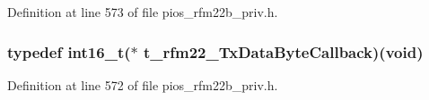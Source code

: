 Definition at line 573 of file pios\-\_\-rfm22b\-\_\-priv.\-h.

\hypertarget{group___p_i_o_s___r_f_m22_b_ga10adbdf30d2b2a9c6eab132094364df2}{
\subsubsection[{t\-\_\-rfm22\-\_\-\-Tx\-Data\-Byte\-Callback}]{\setlength{\rightskip}{0pt plus 5cm}typedef {\bf int16\-\_\-t}($\ast$ t\-\_\-rfm22\-\_\-\-Tx\-Data\-Byte\-Callback)({\bf void})}}\label{group___p_i_o_s___r_f_m22_b_ga10adbdf30d2b2a9c6eab132094364df2}


Definition at line 572 of file pios\-\_\-rfm22b\-\_\-priv.\-h.



